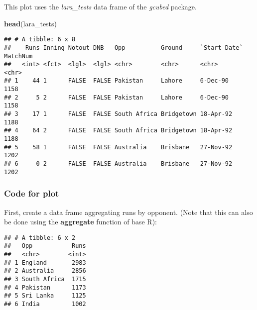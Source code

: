 \documentclass[]{book}
\newenvironment{Shaded}{\begin{snugshade}}{\end{snugshade}}
\newcommand{\DataTypeTok}[1]{\textcolor[rgb]{0.13,0.29,0.53}{#1}}
\newcommand{\KeywordTok}[1]{\textcolor[rgb]{0.13,0.29,0.53}{\textbf{#1}}}
\newcommand{\NormalTok}[1]{#1}
\newcommand{\OperatorTok}[1]{\textcolor[rgb]{0.81,0.36,0.00}{\textbf{#1}}}
\newcommand{\OtherTok}[1]{\textcolor[rgb]{0.56,0.35,0.01}{#1}}
\newcommand{\StringTok}[1]{\textcolor[rgb]{0.31,0.60,0.02}{#1}}
\begin{document}
This plot uses the \emph{lara\_tests} data frame of the \emph{gcubed} package.

\begin{Shaded}
\begin{Highlighting}[]
\KeywordTok{head}\NormalTok{(lara_tests)}
\end{Highlighting}
\end{Shaded}

\begin{verbatim}
## # A tibble: 6 x 8
##    Runs Inning Notout DNB   Opp          Ground     `Start Date` MatchNum
##   <int> <fct>  <lgl>  <lgl> <chr>        <chr>      <chr>        <chr>   
## 1    44 1      FALSE  FALSE Pakistan     Lahore     6-Dec-90     1158    
## 2     5 2      FALSE  FALSE Pakistan     Lahore     6-Dec-90     1158    
## 3    17 1      FALSE  FALSE South Africa Bridgetown 18-Apr-92    1188    
## 4    64 2      FALSE  FALSE South Africa Bridgetown 18-Apr-92    1188    
## 5    58 1      FALSE  FALSE Australia    Brisbane   27-Nov-92    1202    
## 6     0 2      FALSE  FALSE Australia    Brisbane   27-Nov-92    1202
\end{verbatim}

\hypertarget{laracode}{%
\subsubsection*{Code for plot}\label{laracode}}

First, create a data frame aggregating runs by opponent. (Note that this can also be done using the \textbf{aggregate} function of base R):

\begin{Shaded}
\end{Shaded}

\begin{verbatim}
## # A tibble: 6 x 2
##   Opp           Runs
##   <chr>        <int>
## 1 England       2983
## 2 Australia     2856
## 3 South Africa  1715
## 4 Pakistan      1173
## 5 Sri Lanka     1125
## 6 India         1002
\end{verbatim}
\end{document}
